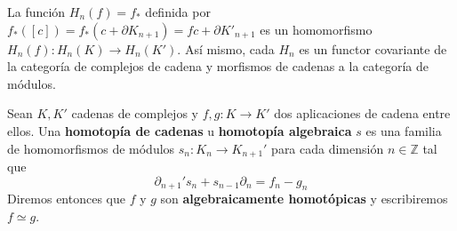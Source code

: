 La función $H_n(f) = f_*$ definida por $f_*([c]) = f_*(c + \partial K_{n+1}) = fc + \partial K'_{n+1}$ es un homomorfismo $H_n(f): H_n(K) \rightarrow H_n(K')$. Así mismo, cada $H_n$ es un functor covariante de la categoría de complejos de cadena y morfismos de cadenas a la categoría de módulos.

\begin{definicion}
	Sean $K,K'$ cadenas de complejos y $f,g: K \rightarrow K'$ dos aplicaciones de cadena entre ellos. Una \textbf{homotopía de cadenas} u \textbf{homotopía algebraica} $s$ es una familia de homomorfismos de módulos $s_n: K_n \rightarrow K_{n+1}'$ para cada dimensión $n \in \mathbb{Z}$ tal que
	\[ \partial_{n+1}'s_n + s_{n-1} \partial_n = f_n - g_n \]
	Diremos entonces que $f$ y $g$ son \textbf{algebraicamente homotópicas} y escribiremos $f \simeq g$.
\end{definicion}


\endinput
